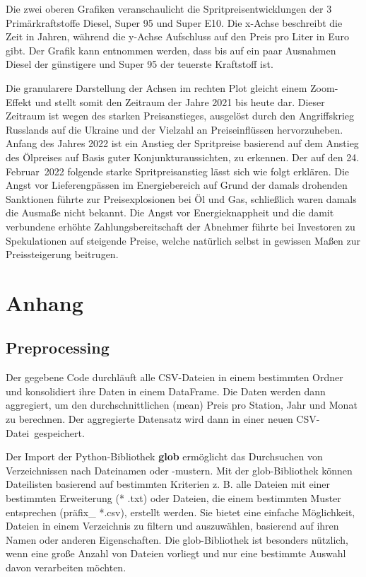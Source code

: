 \documentclass[11pt]{article}
\begin{document}
    Die zwei oberen Grafiken veranschaulicht die Spritpreisentwicklungen der
3 Primärkraftstoffe Diesel, Super 95 und Super E10. Die x-Achse
beschreibt die Zeit in Jahren, während die y-Achse Aufschluss auf den
Preis pro Liter in Euro gibt. Der Grafik kann entnommen werden, dass bis
auf ein paar Ausnahmen Diesel der günstigere und Super 95 der teuerste
Kraftstoff ist.

Die granularere Darstellung der Achsen im rechten Plot gleicht einem
Zoom-Effekt und stellt somit den Zeitraum der Jahre 2021 bis heute dar.
Dieser Zeitraum ist wegen des starken Preisanstieges, ausgelöst durch
den Angriffskrieg Russlands auf die Ukraine und der Vielzahl an
Preiseinflüssen hervorzuheben. Anfang des Jahres 2022 ist ein Anstieg
der Spritpreise basierend auf dem Anstieg des Ölpreises auf Basis guter
Konjunkturaussichten, zu erkennen. Der auf den 24. Februar~2022 folgende
starke Spritpreisanstieg lässt sich wie folgt erklären. Die Angst vor
Lieferengpässen im Energiebereich auf Grund der damals drohenden
Sanktionen führte zur Preisexplosionen bei Öl und Gas, schließlich waren
damals die Ausmaße nicht bekannt. Die Angst vor Energieknappheit und die
damit verbundene erhöhte Zahlungsbereitschaft der Abnehmer führte bei
Investoren zu Spekulationen auf steigende Preise, welche natürlich
selbst in gewissen Maßen zur Preissteigerung beitrugen.


\newpage
   \hypertarget{anhang}{%
\section{Anhang}\label{anhang}}

\hypertarget{preprocessing}{%
\subsection{Preprocessing}
\label{preprocessing}}

Der gegebene Code durchläuft alle CSV-Dateien in einem bestimmten Ordner und konsolidiert ihre Daten in einem DataFrame. Die Daten werden dann aggregiert, um den durchschnittlichen (mean) Preis pro Station, Jahr und Monat zu berechnen. Der aggregierte Datensatz wird dann in einer neuen CSV-Datei gespeichert.

Der Import der Python-Bibliothek \textbf{glob} ermöglicht das Durchsuchen von Verzeichnissen nach Dateinamen oder -mustern. Mit der glob-Bibliothek können Dateilisten basierend auf bestimmten Kriterien z. B. alle Dateien mit einer bestimmten Erweiterung (* .txt) oder Dateien, die einem bestimmten Muster entsprechen (präfix_ *.csv),  erstellt werden. Sie bietet eine einfache Möglichkeit, Dateien in einem Verzeichnis zu filtern und auszuwählen, basierend auf ihren Namen oder anderen Eigenschaften. Die glob-Bibliothek ist besonders nützlich, wenn eine große Anzahl von Dateien vorliegt und nur eine bestimmte Auswahl davon verarbeiten möchten.
\end{document}
